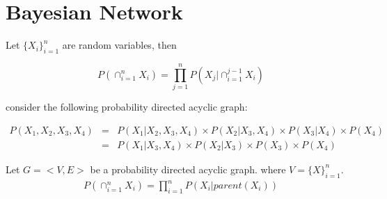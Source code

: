 \documentclass[12pt,a4paper,violet]{bbe}
\begin{document}
	\chapter{Bayesian Network}
    \begin{theorem}
    Let $\{X_i\}_{i = 1}^{n}$ are random variables, then
    
    $$
        P(\cap_{i=1}^{n} X_i) = \prod_{j =1}^{n} P(X_j | \cap_{i=1}^{j-1} X_i)
    $$
    \end{theorem}
    
    consider the following probability directed acyclic graph:
    
    \begin{equation*}
    \begin{aligned} 
        P(X_1,X_2,X_3,X_4) & = & P(X_1 | X_2,X_3,X_4) \times P(X_2 | X_3,X_4) \times P(X_3 | X_4) \times P(X_4) \\
        & = & P(X_1 | X_3,X_4) \times P(X_2 | X_3) \times P(X_3) \times P(X_4)
    \end{aligned}
    \end{equation*}
    
    \begin{theorem}
        Let $G = <V,E>$ be a probability directed acyclic graph. where $V = \{X\}_{i=1}^{n}$.
        \begin{equation*}
            \begin{aligned}
            P(\cap_{i=1}^{n} X_i) = \prod_{i = 1}^{n} P(X_i | parent(X_i))
            \end{aligned}
        \end{equation*}
    \end{theorem}
    
\end{document}
